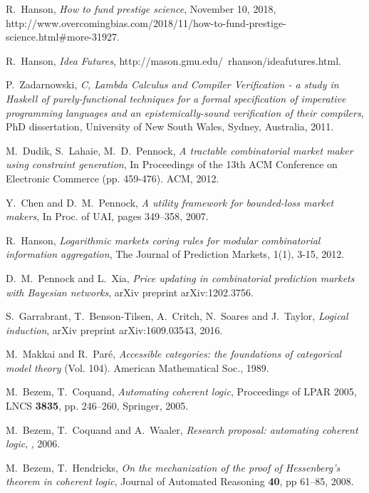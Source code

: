 \documentclass[english,letter paper,12pt,reqno]{article}
\theoremstyle{example}
\begin{document}
\begin{thebibliography}{BHLS03}
R.~Hanson, \textsl{How to fund prestige science}, November 10, 2018, http://www.overcomingbias.com/2018/11/how-to-fund-prestige-science.html\#more-31927.

R.~Hanson, \textsl{Idea Futures}, http://mason.gmu.edu/~rhanson/ideafutures.html.

P.~Zadarnowski, \textsl{C, Lambda Calculus and Compiler Verification - a study in Haskell of purely-functional techniques for a formal specification of imperative programming languages and an epistemically-sound verification of their compilers}, PhD dissertation, University of New South Wales, Sydney, Australia, 2011.

M.~Dudik, S.~Lahaie, M.~D.~Pennock, \textsl{A tractable combinatorial market maker using constraint generation}, In Proceedings of the 13th ACM Conference on Electronic Commerce (pp. 459-476). ACM, 2012.

Y.~Chen and D.~M.~Pennock, \textsl{A utility framework for bounded-loss market makers}, In Proc. of UAI, pages 349–358, 2007.

R.~Hanson, \textsl{Logarithmic markets coring rules for modular combinatorial information aggregation}, The Journal of Prediction Markets, 1(1), 3-15, 2012.

D.~M.~Pennock and L.~Xia, \textsl{Price updating in combinatorial prediction markets with Bayesian networks}, arXiv preprint arXiv:1202.3756.

S.~Garrabrant, T.~Benson-Tilsen, A.~Critch, N.~Soares and J.~Taylor, \textsl{Logical induction}, arXiv preprint arXiv:1609.03543, 2016. 

M.~Makkai and R.~Par\'{e}, \textsl{Accessible categories: the foundations of categorical model theory} (Vol. 104). American Mathematical Soc., 1989.

M.~Bezem, T.~Coquand, \textsl{Automating coherent logic}, Proceedings of LPAR 2005, LNCS \textbf{3835}, pp. 246--260, Springer, 2005.

M.~Bezem, T.~Coquand and A.~Waaler, \textsl{Research proposal: automating coherent logic}, \href{http://www.ii.uib.no/acl/description.pdf}, 2006.

M.~Bezem, T.~Hendricks, \textsl{On the mechanization of the proof of Hessenberg’s theorem in coherent logic}, Journal of Automated Reasoning \textbf{40}, pp 61--85, 2008.


\end{thebibliography}
\end{document}
